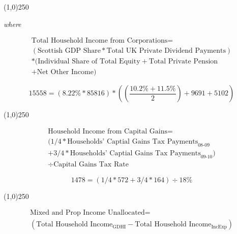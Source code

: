 \begin{enumerate}
\begin{center}
\line(1,0){250}
\end{center}

\textit{where}

\begin{equation} 
\begin{split}
\text{Total Household Income from Corporations} = \\ 
(\text{Scottish GDP Share}*\text{Total UK Private Dividend Payments})\\
*(\text{Individual Share of Total Equity} + \text{Total Private Pension}\\
+ \text{Net Other Income})
\end{split} \label{eq:2.5.5}
\end{equation} 

\begin{equation} \nonumber
15558 = (8.22\% * 85816)*((\frac{10.2\%+11.5\%}{2})+9691+5102)
\end{equation}

\begin{center}
\line(1,0){250}
\end{center}


\begin{equation} 
\begin{split}
\text{Household Income from Capital Gains} = \\ 
(1/4 *\text{Households' Captial Gains Tax Payments}_\text{08-09}\\
+ 3/4 *\text{Households' Captial Gains Tax Payments}_\text{09-10})\\
\div \text{Capital Gains Tax Rate}
\end{split} \label{eq:2.5.6}
\end{equation} 

\begin{equation} \nonumber
1478 = (1/4*572+3/4*164)\div 18\%
\end{equation}

\begin{center}
\line(1,0){250}
\end{center}


\begin{equation} 
\begin{split}
\text{Mixed and Prop Income Unallocated} = \\ 
(\text{Total Household Income}_\text{GDHI}-\text{Total Household Income}_\text{IncExp})\\
\end{split} \label{eq:2.5.7}
\end{equation} 


\end{enumerate}
